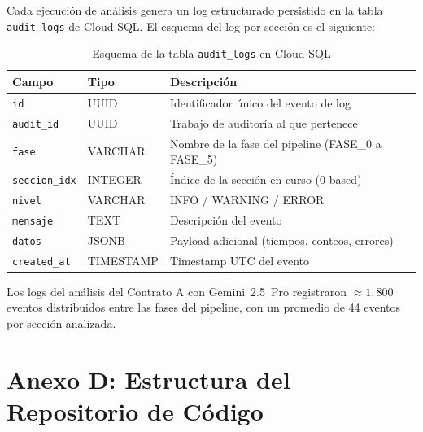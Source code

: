 Cada ejecución de análisis genera un log estructurado persistido en la tabla
\texttt{audit\_logs} de Cloud SQL. El esquema del log por sección es el siguiente:

\begin{table}[H]
\centering
\caption{Esquema de la tabla \texttt{audit\_logs} en Cloud SQL}
\label{tab:audit_logs_schema}
\begin{tabular}{p{3.5cm} p{2.5cm} p{7cm}}
\toprule
\textbf{Campo} & \textbf{Tipo} & \textbf{Descripción} \\
\midrule
\texttt{id}            & UUID      & Identificador único del evento de log \\
\texttt{audit\_id}     & UUID      & Trabajo de auditoría al que pertenece \\
\texttt{fase}          & VARCHAR   & Nombre de la fase del pipeline (FASE\_0 a FASE\_5) \\
\texttt{seccion\_idx}  & INTEGER   & Índice de la sección en curso (0-based) \\
\texttt{nivel}         & VARCHAR   & INFO / WARNING / ERROR \\
\texttt{mensaje}       & TEXT      & Descripción del evento \\
\texttt{datos}         & JSONB     & Payload adicional (tiempos, conteos, errores) \\
\texttt{created\_at}   & TIMESTAMP & Timestamp UTC del evento \\
\bottomrule
\end{tabular}
\end{table}

Los logs del análisis del Contrato A con Gemini~2.5~Pro registraron
$\approx 1{,}800$ eventos distribuidos entre las fases del pipeline, con
un promedio de 44 eventos por sección analizada.

\section*{Anexo D: Estructura del Repositorio de Código}

